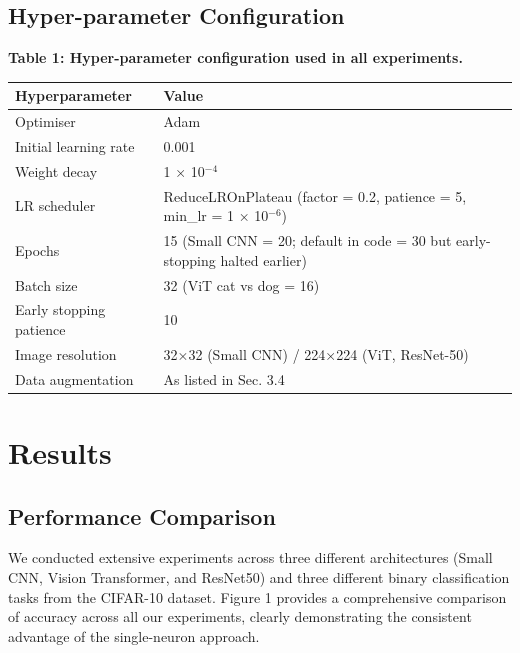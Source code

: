 \documentclass[11pt]{article}
\begin{document}
\subsection{Hyper-parameter Configuration}
\textbf{Table 1: Hyper-parameter configuration used in all experiments.}

\begin{tabular}{ll}
\hline
Hyperparameter & Value \\
\hline
Optimiser & Adam \\
Initial learning rate & 0.001 \\
Weight decay & 1 × 10$^{-4}$ \\
LR scheduler & ReduceLROnPlateau (factor = 0.2, patience = 5, min\_lr = 1 × 10$^{-6}$) \\
Epochs & 15 (Small CNN = 20; default in code = 30 but early-stopping halted earlier) \\
Batch size & 32 (ViT cat vs dog = 16) \\
Early stopping patience & 10 \\
Image resolution & 32×32 (Small CNN) / 224×224 (ViT, ResNet-50) \\
Data augmentation & As listed in Sec. 3.4 \\
\hline
\end{tabular}



\section{Results}
\subsection{Performance Comparison}
We conducted extensive experiments across three different architectures (Small CNN, Vision Transformer, and ResNet50) and three different binary classification tasks from the CIFAR-10 dataset. Figure 1 provides a comprehensive comparison of accuracy across all our experiments, clearly demonstrating the consistent advantage of the single-neuron approach.
\end{document}
